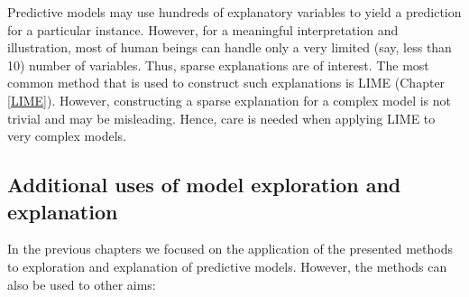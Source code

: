 \documentclass[12pt,]{krantz}
\begin{document}
Predictive models may use hundreds of explanatory variables to yield a prediction for a particular instance. However, for a meaningful interpretation and illustration, most of human beings can handle only a very limited (say, less than 10) number of variables. Thus, sparse explanations are of interest. The most common method that is used to construct such explanations is LIME (Chapter \ref{LIME}). However, constructing a sparse explanation for a complex model is not trivial and may be misleading. Hence, care is needed when applying LIME to very complex models.

\hypertarget{additional-uses-of-model-exploration-and-explanation}{%
\subsection{Additional uses of model exploration and explanation}\label{additional-uses-of-model-exploration-and-explanation}}

In the previous chapters we focused on the application of the presented methods to exploration and explanation of predictive models. However, the methods can also be used to other aims:
\end{document}
